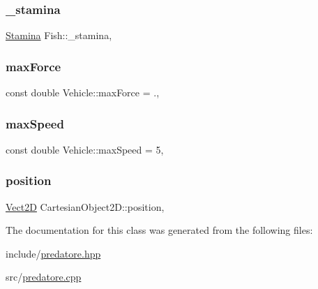 \mbox{\label{classFish_a4948331d0f556344bda8314828eec8dd_a4948331d0f556344bda8314828eec8dd}} 
\subsubsection{\texorpdfstring{\+\_\+stamina}{\_stamina}}
{\footnotesize\ttfamily \hyperlink{classStamina}{Stamina} Fish\+::\+\_\+stamina\hspace{0.3cm}{\ttfamily [protected]}, {\ttfamily [inherited]}}

\mbox{\label{classVehicle_a95c56790e3dc52ab0fa54c279920be54_a95c56790e3dc52ab0fa54c279920be54}} 
\subsubsection{\texorpdfstring{max\+Force}{maxForce}}
{\footnotesize\ttfamily const double Vehicle\+::max\+Force = .\hspace{0.3cm}{\ttfamily [static]}, {\ttfamily [inherited]}}

\mbox{\label{classVehicle_aab47c62e89baa5b7e52c2292451fbcb6_aab47c62e89baa5b7e52c2292451fbcb6}} 
\subsubsection{\texorpdfstring{max\+Speed}{maxSpeed}}
{\footnotesize\ttfamily const double Vehicle\+::max\+Speed = 5\hspace{0.3cm}{\ttfamily [static]}, {\ttfamily [inherited]}}

\mbox{\label{classCartesianObject2D_ae02ec6ed11f9bfc0c748da033d6a32f9_ae02ec6ed11f9bfc0c748da033d6a32f9}} 
\subsubsection{\texorpdfstring{position}{position}}
{\footnotesize\ttfamily \hyperlink{classVect2D}{Vect2D} Cartesian\+Object2\+D\+::position\hspace{0.3cm}{\ttfamily [protected]}, {\ttfamily [inherited]}}



The documentation for this class was generated from the following files\+:\begin{DoxyCompactItemize}
\item 
include/\hyperlink{predatore_8hpp}{predatore.\+hpp}\item 
src/\hyperlink{predatore_8cpp}{predatore.\+cpp}\end{DoxyCompactItemize}
